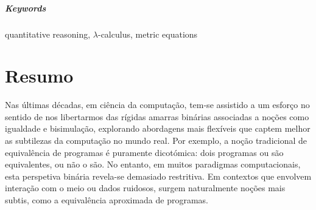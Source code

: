 \begin{comment}
On the semantic side, we show that the following categories satisfy the necessary requirements for interpreting this equation:
\begin{itemize}
    \item the category of metric spaces;
    \item the cocompletion of a $\catMet$-category $\catC$;
    \item the category $\catBan$ of Banach spaces and short maps;
    \item Selinger’s category \( \catQ \) of quantum operations (i.e., completely positive, trace-nonincreasing superoperators)~\cite{selinger2004towards};
    \item Cho’s category \( \WstarCPSUop \), the opposite of \( \WstarCPSU \), consisting of W$^*$-algebras and normal, completely positive, subunital maps.
\end{itemize}
This demonstrates the broad applicability of our approach across several domains.
\end{comment}




\paragraph{Keywords} quantitative reasoning, $\lambda$-calculus, metric equations

\cleardoublepage

\chapter*{Resumo}


Nas últimas décadas, em ciência da computação, tem-se assistido a um esforço no sentido de nos libertarmos das rígidas amarras binárias associadas a noções como igualdade e bisimulação, explorando abordagens mais flexíveis que captem melhor as subtilezas da computação no mundo real. Por exemplo, a noção tradicional de equivalência de programas é puramente dicotómica: dois programas ou são equivalentes, ou não o são. No entanto, em muitos paradigmas computacionais, esta perspetiva binária revela-se demasiado restritiva. Em contextos que envolvem interação com o meio ou dados ruidosos, surgem naturalmente noções mais subtis, como a equivalência aproximada de programas. 

